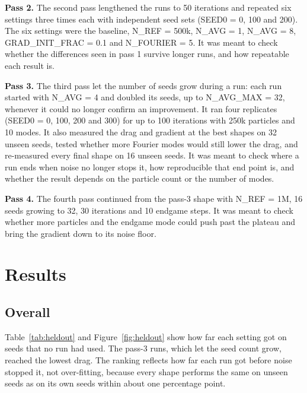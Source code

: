 \documentclass[10pt]{article}
\begin{document}
\textbf{Pass 2.} The second pass lengthened the runs to 50 iterations and repeated six settings three times each with independent seed sets (SEED0 = 0, 100 and 200).
The six settings were the baseline, N\_REF = 500k, N\_AVG = 1, N\_AVG = 8, GRAD\_INIT\_FRAC = 0.1 and N\_FOURIER = 5.
It was meant to check whether the differences seen in pass 1 survive longer runs, and how repeatable each result is.

\textbf{Pass 3.} The third pass let the number of seeds grow during a run: each run started with N\_AVG = 4 and doubled its seeds, up to N\_AVG\_MAX = 32, whenever it could no longer confirm an improvement.
It ran four replicates (SEED0 = 0, 100, 200 and 300) for up to 100 iterations with 250k particles and 10 modes.
It also measured the drag and gradient at the best shapes on 32 unseen seeds, tested whether more Fourier modes would still lower the drag, and re-measured every final shape on 16 unseen seeds.
It was meant to check where a run ends when noise no longer stops it, how reproducible that end point is, and whether the result depends on the particle count or the number of modes.

\textbf{Pass 4.} The fourth pass continued from the pass-3 shape with N\_REF = 1M, 16 seeds growing to 32, 30 iterations and 10 endgame steps.
It was meant to check whether more particles and the endgame mode could push past the plateau and bring the gradient down to its noise floor.

\section{Results}
\subsection{Overall}
Table~\ref{tab:heldout} and Figure~\ref{fig:heldout} show how far each setting got on seeds that no run had used.
The pass-3 runs, which let the seed count grow, reached the lowest drag.
The ranking reflects how far each run got before noise stopped it, not over-fitting, because every shape performs the same on unseen seeds as on its own seeds within about one percentage point.
\end{document}
